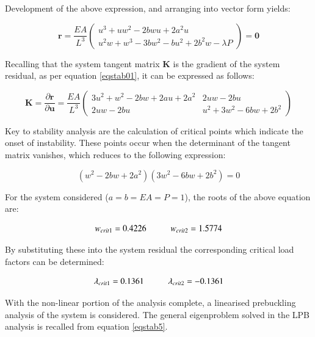 Development of the above expression, and arranging into vector form yields:

\begin{equation} 
\mathbf{r} = 
\frac{EA}{L^3}
\begin{pmatrix}
u^3+uw^2-2bwu+2a^2u \\
u^2w + w^3 - 3bw^2 - bu^2 +2b^2w - \lambda P
\end{pmatrix}
=
\mathbf{0}
\label{eqapp0_6_1}
\end{equation}

Recalling that the system tangent matrix $\mathbf{K}$ is the gradient of the system residual, as per equation \ref{eqstab01}, it can be expressed as follows:

\begin{equation} 
\mathbf{K} = 
\frac{\partial \mathbf{r}}{\partial \mathbf{u}}
=
\frac{EA}{L^3}
\begin{pmatrix}
3u^2 + w^2 - 2bw +2au +2a^2 & 2uw -2bu \\
2uw - 2bu & u^2 + 3w^2 - 6bw + 2b^2
\end{pmatrix}
\label{eqapp0_7}
\end{equation}

Key to stability analysis are the calculation of critical points which indicate the onset of instability. These points occur when the determinant of the tangent matrix vanishes, which reduces to the following expression:

\begin{equation} 
(w^2 - 2bw +2a^2)
(3w^2 -6bw +2b^2) = 0
\label{eqapp0_8}
\end{equation}

For the system considered ($a=b=EA=P=1$), the roots of the above equation are:

\begin{equation} 
w_{crit1} = 0.4226
\hspace{10mm}
w_{crit2} = 1.5774
\label{eqapp0_9}
\end{equation}

By substituting these into the system residual the corresponding critical load factors can be determined:

\begin{equation} 
\lambda_{crit1} = 0.1361
\hspace{10mm}
\lambda_{crit2} = -0.1361
\label{eqapp0_10}
\end{equation}

With the non-linear portion of the analysis complete, a linearised prebuckling analysis of the system is considered. The general eigenproblem solved in the LPB analysis is recalled from equation \ref{eqstab5}.

